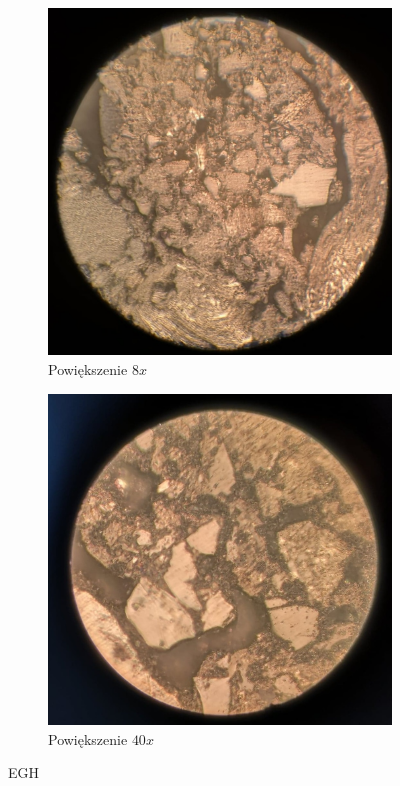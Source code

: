 \begin{figure}[H]
    \begin{subfigure}{.5\textwidth}
        \centering
        \includegraphics[width=.8\linewidth]{img/EGH8.jpg}  
        \caption{Powiększenie $8x$}
    \end{subfigure}
    \begin{subfigure}{.5\textwidth}
        \centering
        \includegraphics[width=.8\linewidth]{img/EGH40.jpg}  
        \caption{Powiększenie $40x$}
    \end{subfigure}
    \caption{EGH}
\end{figure}

